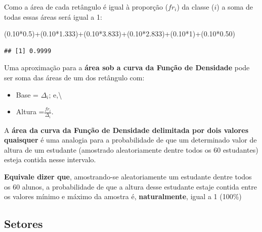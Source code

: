 \documentclass[
]{book}
\newenvironment{Shaded}{\begin{snugshade}}{\end{snugshade}}
\newcommand{\DecValTok}[1]{\textcolor[rgb]{0.00,0.00,0.81}{#1}}
\newcommand{\FloatTok}[1]{\textcolor[rgb]{0.00,0.00,0.81}{#1}}
\newcommand{\NormalTok}[1]{#1}
\newcommand{\SpecialCharTok}[1]{\textcolor[rgb]{0.00,0.00,0.00}{#1}}
\providecommand{\tightlist}{%
  \setlength{\itemsep}{0pt}\setlength{\parskip}{0pt}}
\begin{document}
\hfill\break

Como a área de cada retângulo é igual à proporção (\(fr_{i}\)) da classe (\(i\)) a soma de todas essas áreas será igual a 1:

\hfill\break

\begin{Shaded}
\begin{Highlighting}[]
\NormalTok{(}\FloatTok{0.10}\SpecialCharTok{*}\FloatTok{0.5}\NormalTok{)}\SpecialCharTok{+}\NormalTok{(}\FloatTok{0.10}\SpecialCharTok{*}\FloatTok{1.333}\NormalTok{)}\SpecialCharTok{+}\NormalTok{(}\FloatTok{0.10}\SpecialCharTok{*}\FloatTok{3.833}\NormalTok{)}\SpecialCharTok{+}\NormalTok{(}\FloatTok{0.10}\SpecialCharTok{*}\FloatTok{2.833}\NormalTok{)}\SpecialCharTok{+}\NormalTok{(}\FloatTok{0.10}\SpecialCharTok{*}\DecValTok{1}\NormalTok{)}\SpecialCharTok{+}\NormalTok{(}\FloatTok{0.10}\SpecialCharTok{*}\FloatTok{0.50}\NormalTok{)}
\end{Highlighting}
\end{Shaded}

\begin{verbatim}
## [1] 0.9999
\end{verbatim}

\hfill\break

Uma aproximação para a \textbf{área sob a curva da Função de Densidade} pode ser soma das áreas de um dos retângulo com:

\hfill\break

\begin{itemize}
\tightlist
\item
  Base = \(\Delta_{i}\); e,\textbackslash{}
\item
  Altura =\(\frac{fr_{i}}{\Delta_{i}}\).
\end{itemize}

\hfill\break

A \textbf{área da curva da Função de Densidade delimitada por dois valores quaisquer} é uma analogia para a probabilidade de que um determinado valor de altura de um estudante (amostrado aleatoriamente dentre todos os 60 estudantes) esteja contida nesse intervalo.

\hfill\break

\textbf{Equivale dizer que}, amostrando-se aleatoriamente um estudante dentre todos os 60 alunos, a probabilidade de que a altura desse estudante estaje contida entre os valores mínimo e máximo da amostra é, \textbf{naturalmente}, igual a 1 (100\%)

\hypertarget{setores}{%
\subsection{Setores}\label{setores}}
\end{document}
